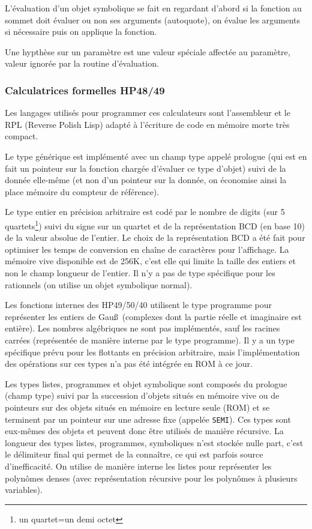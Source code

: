 \documentclass[a4paper,11pt]{article}
\begin{document}
L'évaluation d'un objet symbolique se fait en regardant d'abord si
la fonction au sommet doit évaluer ou non ses arguments (autoquote),
on évalue les arguments si nécessaire puis on applique la fonction.

Une hypthèse sur un paramètre est une valeur spéciale
affectée au paramètre, valeur ignorée par la routine d'évaluation.


\subsubsection{Calculatrices formelles HP48/49}
Les langages utilis\'es pour programmer ces calculateurs sont l'assembleur
et le RPL (Reverse Polish Lisp) adapt\'e \`a l'\'ecriture de code
en m\'emoire morte tr\`es compact.

Le type générique est implémenté avec un champ type appelé prologue (qui est
en fait un pointeur sur la fonction chargée d'évaluer ce type d'objet)
suivi de la donnée elle-même (et non d'un pointeur sur la donnée, on
économise ainsi la place mémoire du compteur de référence).

Le type entier en précision arbitraire est codé par le nombre de digits 
(sur 5 quartets\footnote{un quartet=un demi octet}) suivi du signe sur un 
quartet et de la représentation BCD (en base 10) de la valeur absolue de 
l'entier. Le choix de la représentation BCD a été fait pour optimiser 
les temps de conversion en chaîne de caractères pour l'affichage. La mémoire
vive disponible est de 256K, c'est elle qui limite la taille des entiers 
et non le champ longueur de l'entier. Il n'y a pas de type spécifique 
pour les rationnels (on utilise un objet
symbolique normal). 

Les fonctions internes des HP49/50/40 utilisent 
le type programme pour représenter les entiers de Gau\ss\ (complexes
dont la partie réelle et imaginaire est entière).
Les nombres algébriques ne sont pas implémentés, sauf les racines carrées
(représentée de manière interne par le type programme). 
Il y a un type spécifique prévu pour les flottants en précision arbitraire, 
mais l'implémentation des opérations sur ces types
n'a pas été intégrée en ROM à ce jour. 

Les types listes, programmes et objet symbolique sont composés du prologue
(champ type) suivi par la succession d'objets situés en
mémoire vive ou de pointeurs sur des objets situés en mémoire en lecture 
seule (ROM) et se terminent par un pointeur sur une
adresse fixe (appelée \verb|SEMI|). Ces types sont eux-m\^emes des 
objets et peuvent donc \^etre utilis\'es de mani\`ere
r\'ecursive. La longueur des types listes, programmes, symboliques 
n'est stockée nulle part, c'est le délimiteur final
qui permet de la connaître, ce qui est parfois source d'inefficacité.
On utilise de manière interne les listes pour représenter les 
polyn\^omes denses (avec 
représentation récursive pour les polyn\^omes à plusieurs variables). 
\end{document}
